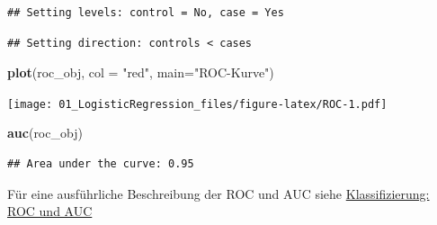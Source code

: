 \documentclass[
]{article}
\newenvironment{Shaded}{\begin{snugshade}}{\end{snugshade}}
\newcommand{\AttributeTok}[1]{\textcolor[rgb]{0.13,0.29,0.53}{#1}}
\newcommand{\FunctionTok}[1]{\textcolor[rgb]{0.13,0.29,0.53}{\textbf{#1}}}
\newcommand{\NormalTok}[1]{#1}
\newcommand{\StringTok}[1]{\textcolor[rgb]{0.31,0.60,0.02}{#1}}
\begin{document}
\begin{verbatim}
## Setting levels: control = No, case = Yes
\end{verbatim}

\begin{verbatim}
## Setting direction: controls < cases
\end{verbatim}

\begin{Shaded}
\begin{Highlighting}[]
  \FunctionTok{plot}\NormalTok{(roc\_obj, }\AttributeTok{col =} \StringTok{"red"}\NormalTok{, }\AttributeTok{main=}\StringTok{"ROC{-}Kurve"}\NormalTok{)}
\end{Highlighting}
\end{Shaded}

\texttt{[image: 01\_LogisticRegression\_files/figure-latex/ROC-1.pdf]}

\begin{Shaded}
\begin{Highlighting}[]
  \FunctionTok{auc}\NormalTok{(roc\_obj)}
\end{Highlighting}
\end{Shaded}

\begin{verbatim}
## Area under the curve: 0.95
\end{verbatim}

Für eine ausführliche Beschreibung der ROC und AUC siehe \href{https://developers.google.com/machine-learning/crash-course/classification/roc-and-auc?hl=de}{Klassifizierung: ROC und AUC}
\end{document}
